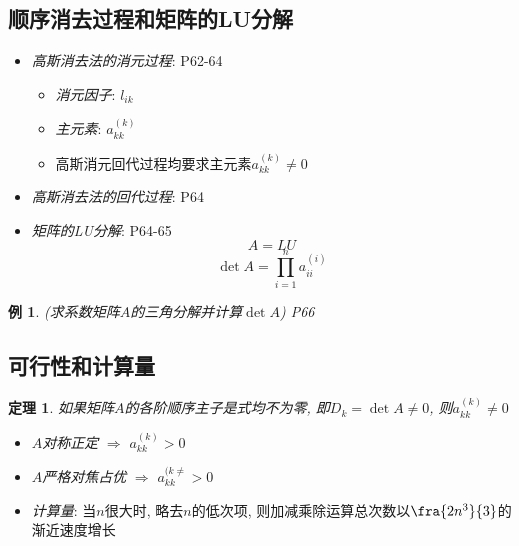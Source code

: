 \documentclass[twoside]{article}
\newtheorem{theorem}{定理}[section]
\newtheorem{eg}{例}[section]
\begin{document}
\subsection{顺序消去过程和矩阵的LU分解}
\begin{itemize}
  \item \textit{高斯消去法的消元过程}: P62-64
    \begin{itemize}
      \item \textit{消元因子}: $l_{ik}$
      \item \textit{主元素}: $a^{(k)}_{kk}$
      \item 高斯消元回代过程均要求主元素$a^{(k)}_{kk}\ne 0$
    \end{itemize}
  \item \textit{高斯消去法的回代过程}: P64
  \item \textit{矩阵的LU分解}: P64-65
    \begin{equation}
      A=LU
    \end{equation}
    \begin{equation}
      \det{A} = \prod^n_{i=1} a^{(i)}_{ii}
    \end{equation}
\end{itemize}
\begin{eg}
  (求系数矩阵$A$的三角分解并计算$\det{A}$)
  P66
\end{eg}
\subsection{可行性和计算量}
\begin{theorem}
  如果矩阵$A$的各阶顺序主子是式均不为零, 即$D_k=\det{A}\ne0$, 则$a^{(k)}_{kk}\ne 0$
\end{theorem}
\begin{itemize}[leftmargin=2em]
  \item \textit{$A$对称正定} $\Rightarrow$ $a^{(k)}_{kk}> 0$
  \item \textit{$A$严格对焦占优} $\Rightarrow$  $a^{(k\ne}_{kk}> 0$
  \item \textit{计算量}: 当$n$很大时, 略去$n$的低次项, 则加减乘除运算总次数以$\fra{2n^3}{3}$的渐近速度增长
\end{itemize}
\end{document}
